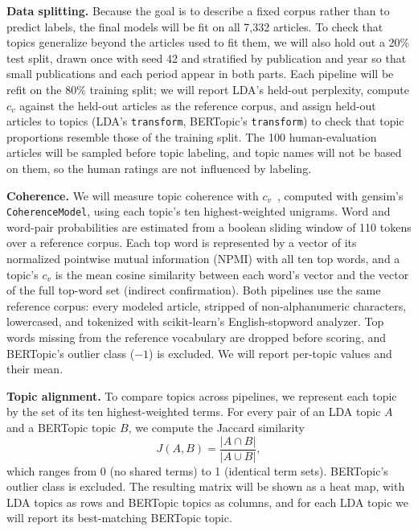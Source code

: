 \documentclass[conference]{IEEEtran}
\begin{document}
\textbf{Data splitting.} Because the goal is to describe a fixed corpus rather than to predict labels, the final models will be fit on all 7,332 articles. To check that topics generalize beyond the articles used to fit them, we will also hold out a 20\% test split, drawn once with seed 42 and stratified by publication and year so that small publications and each period appear in both parts. Each pipeline will be refit on the 80\% training split; we will report LDA's held-out perplexity, compute $c_v$ against the held-out articles as the reference corpus, and assign held-out articles to topics (LDA's \texttt{transform}, BERTopic's \texttt{transform}) to check that topic proportions resemble those of the training split. The 100 human-evaluation articles will be sampled before topic labeling, and topic names will not be based on them, so the human ratings are not influenced by labeling.

\textbf{Coherence.} We will measure topic coherence with $c_v$~\cite{roder2015coherence}, computed with gensim's \texttt{CoherenceModel}, using each topic's ten highest-weighted unigrams. Word and word-pair probabilities are estimated from a boolean sliding window of 110 tokens over a reference corpus. Each top word is represented by a vector of its normalized pointwise mutual information (NPMI) with all ten top words, and a topic's $c_v$ is the mean cosine similarity between each word's vector and the vector of the full top-word set (indirect confirmation). Both pipelines use the same reference corpus: every modeled article, stripped of non-alphanumeric characters, lowercased, and tokenized with scikit-learn's English-stopword analyzer. Top words missing from the reference vocabulary are dropped before scoring, and BERTopic's outlier class ($-1$) is excluded. We will report per-topic values and their mean.

\textbf{Topic alignment.} To compare topics across pipelines, we represent each topic by the set of its ten highest-weighted terms. For every pair of an LDA topic $A$ and a BERTopic topic $B$, we compute the Jaccard similarity
\begin{equation}
J(A,B) = \frac{|A\cap B|}{|A\cup B|},
\label{eq:jaccard}
\end{equation}
which ranges from 0 (no shared terms) to 1 (identical term sets). BERTopic's outlier class is excluded. The resulting matrix will be shown as a heat map, with LDA topics as rows and BERTopic topics as columns, and for each LDA topic we will report its best-matching BERTopic topic.
\end{document}
